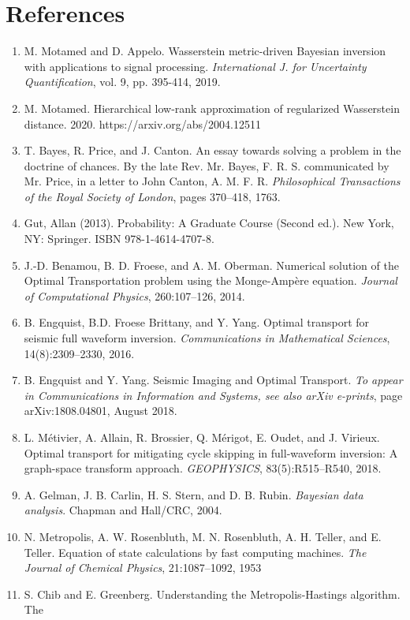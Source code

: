 \documentclass[botnum, fleqn]{unmeethesis}
\begin{document}
\chapter*{References}
\begin{enumerate}

	\item M. Motamed and D. Appelo. Wasserstein metric-driven Bayesian inversion with applications to signal processing. \emph{International J. for Uncertainty Quantification}, vol. 9, pp. 395-414, 2019.
	\item M. Motamed. Hierarchical low-rank approximation of regularized Wasserstein distance. 2020. https://arxiv.org/abs/2004.12511
	\item T. Bayes, R. Price, and J. Canton. An essay towards solving a problem in the doctrine
	of chances. By the late Rev. Mr. Bayes, F. R. S. communicated by Mr. Price, in a letter
	to John Canton, A. M. F. R. \emph{Philosophical Transactions of the Royal Society of London}, pages 370–418, 1763.
	\item Gut, Allan (2013). Probability: A Graduate Course (Second ed.). New York, NY: Springer. ISBN 978-1-4614-4707-8.
	\item J.-D. Benamou, B. D. Froese, and A. M. Oberman. Numerical solution of the Optimal
	Transportation problem using the Monge-Ampère equation. \emph{Journal of Computational
	Physics}, 260:107–126, 2014.
	\item B. Engquist, B.D. Froese Brittany, and Y. Yang. Optimal transport for seismic full
	waveform inversion. \emph{Communications in Mathematical Sciences}, 14(8):2309–2330, 2016.
	\item B. Engquist and Y. Yang. Seismic Imaging and Optimal Transport. \emph{To appear in Communications in Information and Systems, see also arXiv e-prints}, page arXiv:1808.04801, August 2018.
	\item L. Métivier, A. Allain, R. Brossier, Q. Mérigot, E. Oudet, and J. Virieux. Optimal transport for mitigating cycle skipping in full-waveform inversion: A graph-space transform
	approach. \emph{GEOPHYSICS}, 83(5):R515–R540, 2018.
	\item A. Gelman, J. B. Carlin, H. S. Stern, and D. B. Rubin. \emph{Bayesian data analysis}. Chapman
	and Hall/CRC, 2004.
	\item N. Metropolis, A. W. Rosenbluth, M. N. Rosenbluth, A. H. Teller, and E. Teller. Equation of state calculations by fast computing machines. \emph{The Journal of Chemical Physics},
	21:1087–1092, 1953
	\item S. Chib and E. Greenberg. Understanding the Metropolis-Hastings algorithm. The

\end{enumerate}
\end{document}
